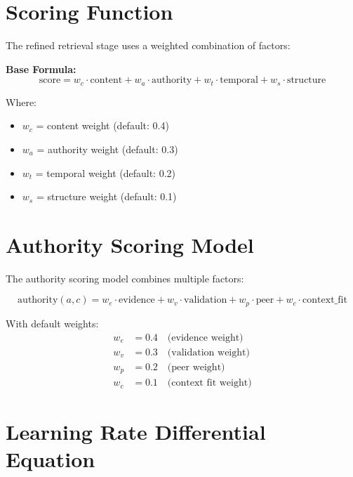 
\section{Scoring Function}

The refined retrieval stage uses a weighted combination of factors:

\textbf{Base Formula:}
\begin{equation}
\text{score} = w_c \cdot \text{content} + w_a \cdot \text{authority} + w_t \cdot \text{temporal} + w_s \cdot \text{structure}
\end{equation}

Where:
\begin{itemize}
    \item $w_c$ = content weight (default: 0.4)
    \item $w_a$ = authority weight (default: 0.3)
    \item $w_t$ = temporal weight (default: 0.2)
    \item $w_s$ = structure weight (default: 0.1)
\end{itemize}

\section{Authority Scoring Model}

The authority scoring model combines multiple factors:

\begin{equation}
\text{authority}(a, c) = w_e \cdot \text{evidence} + w_v \cdot \text{validation} + w_p \cdot \text{peer} + w_c \cdot \text{context\_fit}
\end{equation}

With default weights:
\begin{align}
w_e &= 0.4 \quad \text{(evidence weight)} \\
w_v &= 0.3 \quad \text{(validation weight)} \\
w_p &= 0.2 \quad \text{(peer weight)} \\
w_c &= 0.1 \quad \text{(context fit weight)}
\end{align}

\section{Learning Rate Differential Equation}

